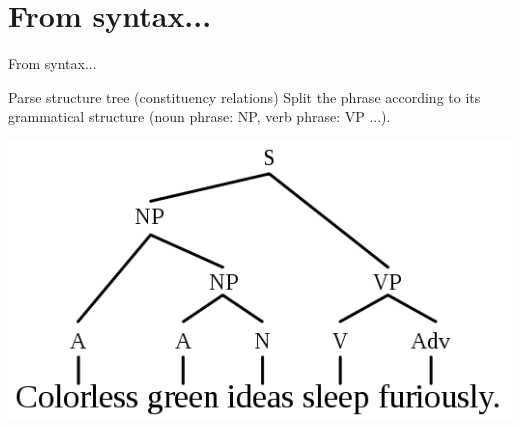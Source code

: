 \documentclass[10pt]{beamer}
\begin{document}

\section{From syntax...}

\begin{frame}{From syntax...}

\begin{block}{Parse structure tree (constituency relations)}
	Split the phrase according to its grammatical structure (noun phrase: NP, verb phrase: VP ...).
	\begin{center}
		\includegraphics[scale=0.30]{522px-Cgisf-tgg.png}
	\end{center}
\end{block}
		
\end{frame}

\end{document}
